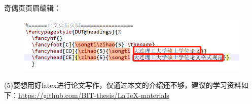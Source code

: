 奇偶页页眉编辑：\par
\begin{figure}[!ht]
	\centering
	\includegraphics{figures/figure12}
\end{figure}
(5)要想用好latex进行论文写作，仅通过本文的介绍还不够，建议的学习资料如下：\url{https://github.com/BIT-thesis/LaTeX-materials}\par

